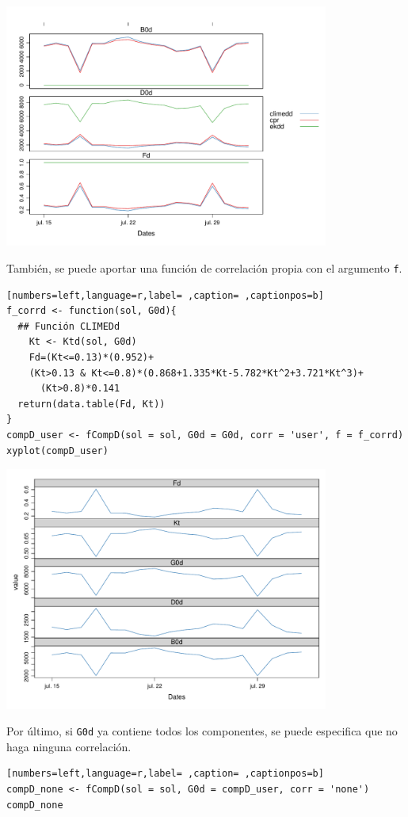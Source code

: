 \begin{itemize}
\begin{itemize}
\begin{center}
\includegraphics[width=0.8\textwidth]{figuras/codigo-fcompddia.pdf}
\end{center}
También, se puede aportar una función de correlación propia con el argumento \texttt{f}.
\begin{lstlisting}[numbers=left,language=r,label= ,caption= ,captionpos=b]
f_corrd <- function(sol, G0d){
  ## Función CLIMEDd
    Kt <- Ktd(sol, G0d)
    Fd=(Kt<=0.13)*(0.952)+
    (Kt>0.13 & Kt<=0.8)*(0.868+1.335*Kt-5.782*Kt^2+3.721*Kt^3)+
      (Kt>0.8)*0.141
  return(data.table(Fd, Kt))
}
compD_user <- fCompD(sol = sol, G0d = G0d, corr = 'user', f = f_corrd)
xyplot(compD_user)
\end{lstlisting}

\begin{center}
\includegraphics[width=0.8\textwidth]{figuras/codigo-fcompduser.pdf}
\end{center}
Por último, si \texttt{G0d} ya contiene todos los componentes, se puede especifica que no haga ninguna correlación.
\begin{lstlisting}[numbers=left,language=r,label= ,caption= ,captionpos=b]
compD_none <- fCompD(sol = sol, G0d = compD_user, corr = 'none')
compD_none
\end{lstlisting}


\end{itemize}
\end{itemize}

